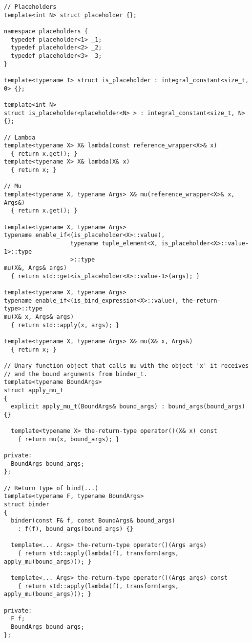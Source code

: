 \documentclass{article}
\begin{document}
 \small
\begin{verbatim}
// Placeholders
template<int N> struct placeholder {};

namespace placeholders {
  typedef placeholder<1> _1;
  typedef placeholder<2> _2;
  typedef placeholder<3> _3;
}

template<typename T> struct is_placeholder : integral_constant<size_t, 0> {};

template<int N> 
struct is_placeholder<placeholder<N> > : integral_constant<size_t, N> {};

// Lambda
template<typename X> X& lambda(const reference_wrapper<X>& x)
  { return x.get(); }
template<typename X> X& lambda(X& x)
  { return x; }

// Mu
template<typename X, typename Args> X& mu(reference_wrapper<X>& x, Args&)
  { return x.get(); }

template<typename X, typename Args>
typename enable_if<(is_placeholder<X>::value),
                   typename tuple_element<X, is_placeholder<X>::value-1>::type
                   >::type
mu(X&, Args& args)
  { return std::get<is_placeholder<X>::value-1>(args); }

template<typename X, typename Args>
typename enable_if<(is_bind_expression<X>::value), the-return-type>::type
mu(X& x, Args& args)
  { return std::apply(x, args); }

template<typename X, typename Args> X& mu(X& x, Args&)
  { return x; }

// Unary function object that calls mu with the object 'x' it receives
// and the bound arguments from binder_t.
template<typename BoundArgs>
struct apply_mu_t
{
  explicit apply_mu_t(BoundArgs& bound_args) : bound_args(bound_args) {}

  template<typename X> the-return-type operator()(X& x) const
    { return mu(x, bound_args); }

private:
  BoundArgs bound_args;
};

// Return type of bind(...)
template<typename F, typename BoundArgs>
struct binder
{
  binder(const F& f, const BoundArgs& bound_args)
    : f(f), bound_args(bound_args) {}

  template<... Args> the-return-type operator()(Args args)
    { return std::apply(lambda(f), transform(args, apply_mu(bound_args))); }

  template<... Args> the-return-type operator()(Args args) const
    { return std::apply(lambda(f), transform(args, apply_mu(bound_args))); }

private:
  F f;
  BoundArgs bound_args;
};


\end{verbatim}
\end{document}
